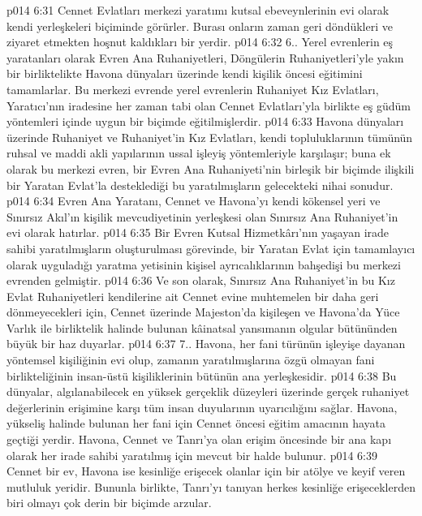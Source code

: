 \vs p014 6:31 Cennet Evlatları merkezi yaratımı kutsal ebeveynlerinin evi olarak kendi yerleşkeleri biçiminde görürler. Burası onların zaman geri döndükleri ve ziyaret etmekten hoşnut kaldıkları bir yerdir.
\vs p014 6:32 6.\bibnobreakspace {}. Yerel evrenlerin eş yaratanları olarak Evren Ana Ruhaniyetleri, Döngülerin Ruhaniyetleri’yle yakın bir birliktelikte Havona dünyaları üzerinde kendi kişilik öncesi eğitimini tamamlarlar. Bu merkezi evrende yerel evrenlerin Ruhaniyet Kız Evlatları, Yaratıcı’nın iradesine her zaman tabi olan Cennet Evlatları’yla birlikte eş güdüm yöntemleri içinde uygun bir biçimde eğitilmişlerdir.
\vs p014 6:33 Havona dünyaları üzerinde Ruhaniyet ve Ruhaniyet’in Kız Evlatları, kendi topluluklarının tümünün ruhsal ve maddi akli yapılarının ussal işleyiş yöntemleriyle karşılaşır; buna ek olarak bu merkezi evren, bir Evren Ana Ruhaniyeti’nin birleşik bir biçimde ilişkili bir Yaratan Evlat’la desteklediği bu yaratılmışların gelecekteki nihai sonudur.
\vs p014 6:34 Evren Ana Yaratanı, Cennet ve Havona’yı kendi kökensel yeri ve Sınırsız Akıl’ın kişilik mevcudiyetinin yerleşkesi olan Sınırsız Ana Ruhaniyet’in evi olarak hatırlar.
\vs p014 6:35 Bir Evren Kutsal Hizmetkârı’nın yaşayan irade sahibi yaratılmışların oluşturulması görevinde, bir Yaratan Evlat için tamamlayıcı olarak uyguladığı yaratma yetisinin kişisel ayrıcalıklarının bahşedişi bu merkezi evrenden gelmiştir.
\vs p014 6:36 Ve son olarak, Sınırsız Ana Ruhaniyet’in bu Kız Evlat Ruhaniyetleri kendilerine ait Cennet evine muhtemelen bir daha geri dönmeyecekleri için, Cennet üzerinde Majeston’da kişileşen ve Havona’da Yüce Varlık ile birliktelik halinde bulunan kâinatsal yansımanın olgular bütününden büyük bir haz duyarlar.
\vs p014 6:37 7.\bibnobreakspace {}. Havona, her fani türünün işleyişe dayanan yöntemsel kişiliğinin evi olup, zamanın yaratılmışlarına özgü olmayan fani birlikteliğinin insan\hyp{}üstü kişiliklerinin bütünün ana yerleşkesidir.
\vs p014 6:38 Bu dünyalar, algılanabilecek en yüksek gerçeklik düzeyleri üzerinde gerçek ruhaniyet değerlerinin erişimine karşı tüm insan duyularının uyarıcılığını sağlar. Havona, yükseliş halinde bulunan her fani için Cennet öncesi eğitim amacının hayata geçtiği yerdir. Havona, Cennet ve Tanrı’ya olan erişim öncesinde bir ana kapı olarak her irade sahibi yaratılmış için mevcut bir halde bulunur.
\vs p014 6:39 Cennet bir ev, Havona ise kesinliğe erişecek olanlar için bir atölye ve keyif veren mutluluk yeridir. Bununla birlikte, Tanrı’yı tanıyan herkes kesinliğe erişeceklerden biri olmayı çok derin bir biçimde arzular.
